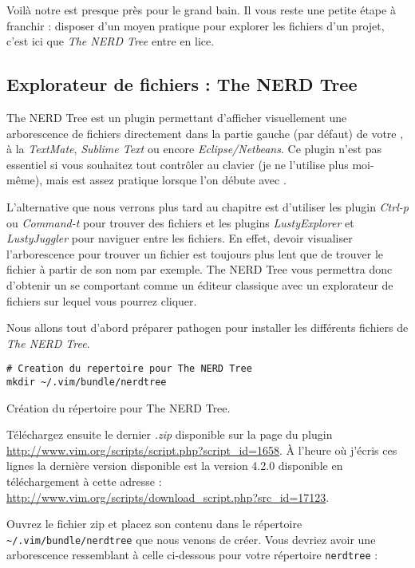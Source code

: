 Voilà notre \vim est presque près pour le grand bain. Il vous reste une petite étape à franchir : disposer d'un moyen pratique pour explorer les fichiers d'un projet, c'est ici que \emph{The NERD Tree} entre en lice.

\subsection{Explorateur de fichiers : The NERD Tree}
\label{ssec:nerdtree}
The NERD Tree est un plugin permettant d'afficher visuellement une arborescence de fichiers directement dans la partie gauche (par défaut) de votre \vim, à la \emph{TextMate}, \emph{Sublime Text} ou encore \emph{Eclipse/Netbeans}. Ce plugin n'est pas essentiel si vous souhaitez tout contrôler au clavier (je ne l'utilise plus moi-même), mais est assez pratique lorsque l'on débute avec \vim.

L'alternative que nous verrons plus tard au chapitre \TODO est d'utiliser les plugin \emph{Ctrl-p} ou \emph{Command-t} pour trouver des fichiers et les plugins \emph{LustyExplorer} et \emph{LustyJuggler} pour naviguer entre les fichiers. En effet, devoir visualiser l'arborescence pour trouver un fichier est toujours plus lent que de trouver le fichier à partir de son nom par exemple. The NERD Tree vous permettra donc d'obtenir un \vim se comportant comme un éditeur classique avec un explorateur de fichiers sur lequel vous pourrez cliquer.

Nous allons tout d'abord préparer pathogen pour installer les différents fichiers de \emph{The NERD Tree}.

\begin{listing}[H]
\begin{verbatim}
# Creation du repertoire pour The NERD Tree
mkdir ~/.vim/bundle/nerdtree
\end{verbatim}
  \caption{Création du répertoire pour The NERD Tree.}
  \label{code:nerdtree-bundle}
\end{listing}

Téléchargez ensuite le dernier \emph{.zip} disponible sur la page du plugin \url{http://www.vim.org/scripts/script.php?script_id=1658}. À l'heure où j'écris ces lignes la dernière version disponible est la version 4.2.0 disponible en téléchargement à cette adresse : \url{http://www.vim.org/scripts/download_script.php?src_id=17123}.

Ouvrez le fichier zip et placez son contenu dans le répertoire \Verb|~/.vim/bundle/nerdtree| que nous venons de créer. Vous devriez avoir une arborescence ressemblant à celle ci-dessous pour votre répertoire \Verb|nerdtree| :

